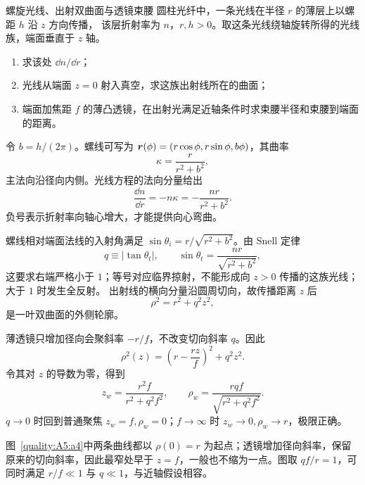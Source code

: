 \begin{advexamplebox}{螺旋光线、出射双曲面与透镜束腰}\label{advA5:ex:helical-fiber}
圆柱光纤中，一条光线在半径 $r$ 的薄层上以螺距 $h$ 沿 $z$ 方向传播，
该层折射率为 $n$，$r,h>0$。取这条光线绕轴旋转所得的光线族，端面垂直于 $z$ 轴。

\begin{enumerate}
\item 求该处 $\dd n/\dd r$；
\item 光线从端面 $z=0$ 射入真空，求这族出射线所在的曲面；
\item 端面加焦距 $f$ 的薄凸透镜，在出射光满足近轴条件时求束腰半径和束腰到端面的距离。
\end{enumerate}

\end{advexamplebox}
\begin{advsolution}
令 $b=h/(2\pi)$。螺线可写为
$\bm{r}(\phi)=(r\cos\phi,r\sin\phi,b\phi)$，其曲率
\[
 \kappa=\frac{r}{r^2+b^2},
\]
主法向沿径向内侧。光线方程的法向分量给出
\[
 \boxed{\frac{\dd n}{\dd r}=-n\kappa
 =-\frac{nr}{r^2+b^2}}.
\]
负号表示折射率向轴心增大，才能提供向心弯曲。

螺线相对端面法线的入射角满足
$\sin\theta_i=r/\sqrt{r^2+b^2}$。由 Snell 定律
\[
 q\equiv|\tan\theta_t|,\qquad
 \sin\theta_t=\frac{nr}{\sqrt{r^2+b^2}},
\]
这要求右端严格小于 $1$；等号对应临界掠射，不能形成向 $z>0$ 传播的这族光线；大于 $1$ 时发生全反射。
出射线的横向分量沿圆周切向，故传播距离 $z$ 后
\[
 \boxed{\rho^2=r^2+q^2z^2},
\]
是一叶双曲面的外侧轮廓。

薄透镜只增加径向会聚斜率 $-r/f$，不改变切向斜率 $q$。因此
\[
 \rho^2(z)=\left(r-\frac{rz}{f}\right)^2+q^2z^2.
\]
令其对 $z$ 的导数为零，得到
\[
 \boxed{z_w=\frac{r^2f}{r^2+q^2f^2}},\qquad
 \boxed{\rho_w=\frac{rqf}{\sqrt{r^2+q^2f^2}}}.
\]
$q\to0$ 时回到普通聚焦 $z_w=f,\rho_w=0$；$f\to\infty$ 时
$z_w\to0,\rho_w\to r$，极限正确。


图~\ref{quality:A5:a4}中两条曲线都以 $\rho(0)=r$ 为起点；透镜增加径向斜率，保留原来的切向斜率，因此最窄处早于 $z=f$，一般也不缩为一点。图取 $qf/r=1$，可同时满足 $r/f\ll1$ 与 $q\ll1$，与近轴假设相容。
\end{advsolution}

